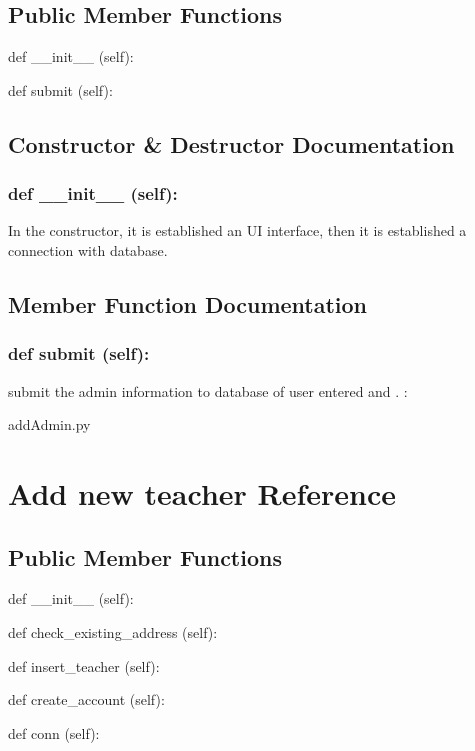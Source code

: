 \subsection*{Public Member Functions}
\begin{DoxyCompactItemize}
\item 
def {\_\_init\_\_} (self):
\item 
def {submit} (self):
\end{DoxyCompactItemize}

\subsection{Constructor \& Destructor Documentation}
\hypertarget{class_poly_aa3def076b74bed67904976ad4f9fe9b1}{
\subsubsection[{__init__ (self):}]{\setlength{\rightskip}{0pt plus 5cm}def {\_\_init\_\_} (self): 
}}
In the constructor, it is established an UI interface, then it is  established a connection with database.

\subsection{Member Function Documentation}

\hypertarget{class_poly_a14a7ad77ce612b0c54f531d307ee4b39}{
\subsubsection[{def submit(self):}]{\setlength{\rightskip}{0pt plus 5cm}def {submit} (self):}}\label{class_poly_a14a7ad77ce612b0c54f531d307ee4b39}
submit the admin information to database of user entered and .
:\begin{DoxyCompactItemize}
\item 
addAdmin.\-py\end{DoxyCompactItemize}


\hypertarget{Add_new_teacher}{\section{Add new teacher Reference}
\label{Add_new_teacher}
}
\subsection*{Public Member Functions}
\begin{DoxyCompactItemize}
\item 
def {\_\_init\_\_} (self):
\item 
def {check\_existing\_address} (self):
\item 
def {insert\_teacher} (self):
\item 
def {create\_account} (self):
\item 
def {conn} (self):

\end{DoxyCompactItemize}

